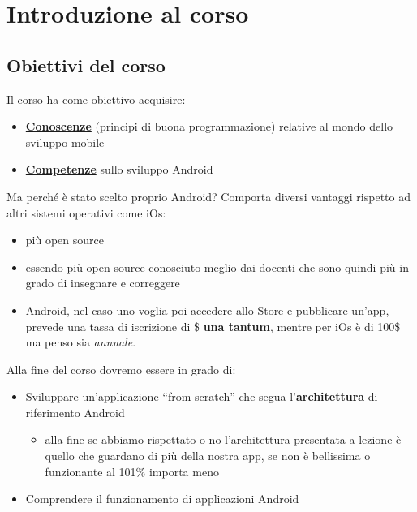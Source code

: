 
\chapter{Introduzione al corso}
\section{Obiettivi del corso}
\par Il corso ha come obiettivo acquisire:
\begin{itemize}
    \item \textbf{\underline{Conoscenze}} (principi di buona programmazione) relative al mondo dello sviluppo mobile
    \item \textbf{\underline{Competenze}} sullo sviluppo Android 
\end{itemize}
\par Ma perché è stato scelto proprio Android? Comporta diversi vantaggi rispetto ad altri sistemi operativi come iOs:
\begin{itemize}
    \item più open source
    \item essendo più open source conosciuto meglio dai docenti che sono quindi più in grado di insegnare e correggere
    \item Android, nel caso uno voglia poi accedere allo Store e pubblicare un'app, prevede una tassa di iscrizione di \$ \textbf{una tantum}, mentre per iOs è di 100\$ ma penso sia \textit{annuale}.
\end{itemize}
\par Alla fine del corso dovremo essere in grado di:
\begin{itemize}
    \item Sviluppare un'applicazione ``from scratch'' che segua l'\textbf{\underline{architettura}} di riferimento Android
    \begin{itemize}
        \item alla fine se abbiamo rispettato o no l'architettura presentata a lezione è quello che guardano di più della nostra app, se non è bellissima o funzionante al 101\% importa meno
    \end{itemize}
    \item Comprendere il funzionamento di applicazioni Android
\end{itemize} 

